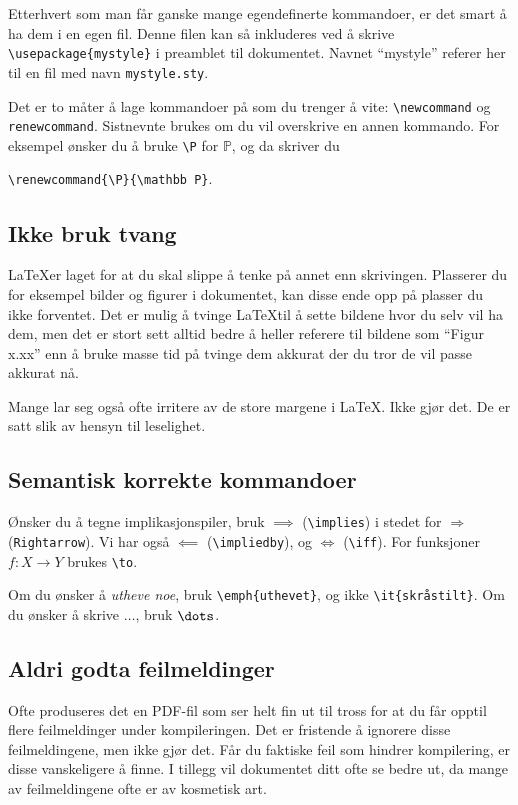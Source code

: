 \documentclass[a4paper, norsk]{article}  %
\renewcommand{\P}{\mathbb{P}}
\begin{document}
Etterhvert som man får ganske mange egendefinerte kommandoer, er det smart å ha dem i en egen fil. Denne filen kan så inkluderes ved å skrive \verb|\usepackage{mystyle}| i preamblet til dokumentet. Navnet ``mystyle'' referer her til en fil med navn \verb|mystyle.sty|.

Det er to måter å lage kommandoer på som du trenger å vite: \verb|\newcommand| og \verb|renewcommand|. Sistnevnte brukes om du vil overskrive en annen kommando. For eksempel ønsker du å bruke \verb|\P| for $\P$, og da skriver du 
\begin{center}
\texttt{\textbackslash renewcommand\{\textbackslash P\}\{\textbackslash mathbb P\}}.
\end{center}

\subsection{Ikke bruk tvang}

\LaTeX er laget for at du skal slippe å tenke på annet enn skrivingen. Plasserer du for eksempel bilder og figurer i dokumentet, kan disse ende opp på plasser du ikke forventet. Det er mulig å tvinge \LaTeX til å sette bildene hvor du selv vil ha dem, men det er stort sett alltid bedre å heller referere til bildene som ``Figur x.xx'' enn å bruke masse tid på tvinge dem akkurat der du tror de vil passe akkurat nå.

Mange lar seg også ofte irritere av de store margene i \LaTeX. Ikke gjør det. De er satt slik av hensyn til leselighet.

\subsection{Semantisk korrekte kommandoer}

Ønsker du å tegne implikasjonspiler, bruk $\implies$ (\verb|\implies|) i stedet for $\Rightarrow$ (\verb|Rightarrow|). Vi har også $\impliedby$ (\verb|\impliedby|), og $\iff$ (\verb|\iff|). For funksjoner $f:X \to Y$ brukes \verb|\to|.

Om du ønsker å \emph{utheve noe}, bruk \verb|\emph{uthevet}|, og ikke \verb|\it{skråstilt}|. Om du ønsker å skrive $\dots$, bruk $\verb|\dots|$. 

\subsection{Aldri godta feilmeldinger}

Ofte produseres det en PDF-fil som ser helt fin ut til tross for at du får opptil flere feilmeldinger under kompileringen. Det er fristende å ignorere disse feilmeldingene, men ikke gjør det. Får du faktiske feil som hindrer kompilering, er disse vanskeligere å finne. I tillegg vil dokumentet ditt ofte se bedre ut, da mange av feilmeldingene ofte er av kosmetisk art.
\end{document}
